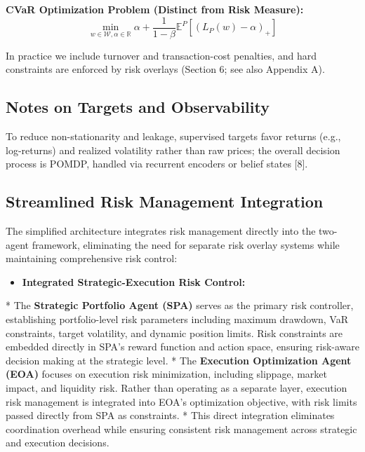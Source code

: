 \documentclass[11pt,a4paper]{article}
\begin{document}
\textbf{CVaR Optimization Problem (Distinct from Risk Measure):}
\begin{equation}
\min_{w \in \mathcal{W}, \alpha \in \mathbb{R}} \alpha + \frac{1}{1-\beta}\mathbb{E}^P[(L_P(w) - \alpha)_+]
\end{equation}

In practice we include turnover and transaction-cost penalties, and hard constraints are enforced by risk overlays (Section 6; see also Appendix A).

\subsection{Notes on Targets and Observability}

To reduce non-stationarity and leakage, supervised targets favor returns (e.g., log-returns) and realized volatility rather than raw prices; the overall decision process is POMDP, handled via recurrent encoders or belief states [8].

\subsection{Streamlined Risk Management Integration}

The simplified architecture integrates risk management directly into the two-agent framework, eliminating the need for separate risk overlay systems while maintaining comprehensive risk control:

\begin{itemize}
\item   \textbf{Integrated Strategic-Execution Risk Control:}
\end{itemize}
    *   The \textbf{Strategic Portfolio Agent (SPA)} serves as the primary risk controller, establishing portfolio-level risk parameters including maximum drawdown, VaR constraints, target volatility, and dynamic position limits. Risk constraints are embedded directly in SPA's reward function and action space, ensuring risk-aware decision making at the strategic level.
    *   The \textbf{Execution Optimization Agent (EOA)} focuses on execution risk minimization, including slippage, market impact, and liquidity risk. Rather than operating as a separate layer, execution risk management is integrated into EOA's optimization objective, with risk limits passed directly from SPA as constraints.
    *   This direct integration eliminates coordination overhead while ensuring consistent risk management across strategic and execution decisions.
\end{document}
